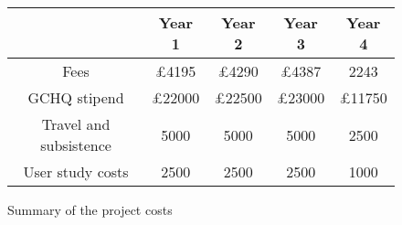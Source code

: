 \documentclass[10pt]{article}
\begin{document}
\begin{figure}[h!t]
\begin{center}
\begin{tabular}{|c|c|c|c|c|}
\hline 
& {\bf Year 1} &{\bf Year 2}&{\bf Year 3}&{\bf Year 4}\\
\hline
Fees & £4195 & £4290 & £4387 & 2243 \\
\hline
GCHQ stipend & £22000 & £22500 & £23000 & £11750 \\
\hline
Travel and subsistence & 5000 & 5000 & 5000 & 2500 \\
\hline
User study costs & 2500 & 2500 & 2500 & 1000 \\
\hline
\end{tabular}
\end{center}
\caption{Summary of the project costs}
\label{fig:costs}
\end{figure}

%
%
%
%
\small


\end{document}
